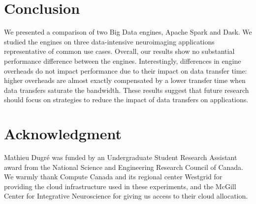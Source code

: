 \documentclass[conference]{IEEEtran}
\begin{document}
\section{Conclusion}
We presented a comparison of two Big Data engines, Apache Spark and Dask.
We studied the engines on three data-intensive neuroimaging applications
representative of common use cases. Overall, our results show no substantial
performance difference between the engines. Interestingly, differences in
engine overheads do not impact performance due to their impact on data
transfer time: higher overheads are almost exactly compensated by a lower
transfer time when data transfers saturate the bandwidth. These results
suggest that future research should focus on strategies to reduce the
impact of data transfers on applications.

\section*{Acknowledgment}

Mathieu Dugr\'e was funded by an Undergraduate Student Research Assistant award from
the National Science and Engineering Research Council of Canada. We warmly thank
Compute Canada and its regional center Westgrid for providing the cloud infrastructure used in
these experiments, and the McGill Center for Integrative Neuroscience for giving us
access to their cloud allocation.



\end{document}
